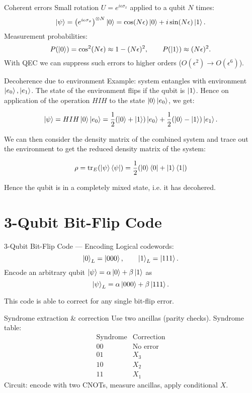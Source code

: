 \documentclass[10pt]{beamer}
\begin{document}
\begin{frame}{Coherent errors}
  Small rotation \(U = e^{i\epsilon \sigma_x}\) applied to a qubit \(N\) times:
  \[
    \ket{\psi} = \bigl(e^{i\epsilon \sigma_x}\bigr)^{\otimes N}\ket{0}
           = \cos(N\epsilon)\ket{0} + i\sin(N\epsilon)\ket{1}.
  \]
  Measurement probabilities:
  \[
    P(\ket{0})=\cos^2(N\epsilon)\approx 1-(N\epsilon)^2,\qquad 
    P(\ket{1})\approx (N\epsilon)^2.
  \]
  With QEC we can suppress such errors to higher orders ($O(\epsilon^2) \to O(\epsilon^6)$).
\end{frame}

\begin{frame}{Decoherence due to environment}
  Example: system entangles with environment \(\ket{e_0},\ket{e_1}\). The state of the environment flips if the qubit is \(\ket{1}\). Hence on application of the operation \(HIH\) to the state \(\ket{0} \ket{e_0}\), we get:

  \begin{equation*}
    \ket{\psi} = HIH \ket{0} \ket{e_0} = \frac{1}{2}(\ket{0}+\ket{1})\ket{e_0} + \frac{1}{2}(\ket{0}-\ket{1})\ket{e_1}.
  \end{equation*}

  We can then consider the density matrix of the combined system and trace out the environment to get the reduced density matrix of the system:

    \begin{equation*}
        \rho = \tr_E(\ket{\psi}\bra{\psi}) = \frac{1}{2} (
            \ket{0}\bra{0} + \ket{1}\bra{1}
        )
    \end{equation*}

    Hence the qubit is in a completely mixed state, i.e. it has decohered.
\end{frame}

\section{3-Qubit Bit-Flip Code}
\begin{frame}{3-Qubit Bit-Flip Code — Encoding}
  Logical codewords:
  \[
    \ket{0}_L=\ket{000},\qquad \ket{1}_L=\ket{111}.
  \]
  Encode an arbitrary qubit \(\ket{\psi}=\alpha\ket{0}+\beta\ket{1}\) as
  \[
    \ket{\psi}_L=\alpha\ket{000}+\beta\ket{111}.
  \]
 
  This code is able to correct for any single bit-flip error.
\end{frame}

\begin{frame}{Syndrome extraction \& correction}
  Use two ancillas (parity checks). Syndrome table:
  \[
    \begin{array}{c|c}
      \text{Syndrome} & \text{Correction} \\ \hline
      00 & \text{No error} \\
      01 & X_3 \\
      10 & X_2 \\
      11 & X_1
    \end{array}
  \]
  Circuit: encode with two CNOTs, measure ancillas, apply conditional \(X\).
\end{frame}
\end{document}
